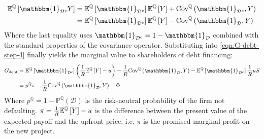 \documentclass[../main.tex]{subfiles}
\begin{document}
            \begin{align*}
                \mathbb{E}^{\mathbb{Q}}\left[
                    \mathbbm{1}_{\mathcal{D}^{c}}Y
                \right]
                &=
                \mathbb{E}^{\mathbb{Q}}\left[\mathbbm{1}_{\mathcal{D}^{c}}\right] 
                \mathbb{E}^{\mathbb{Q}}\left[Y\right] 
                + 
                \text{Cov}^{\mathbb{Q}}\left(\mathbbm{1}_{\mathcal{D}^{c}}, Y\right) 
                \\
                &=
                \mathbb{E}^{\mathbb{Q}}\left[\mathbbm{1}_{\mathcal{D}^{c}}\right] 
                \mathbb{E}^{\mathbb{Q}}\left[Y\right] 
                - 
                \text{Cov}^{\mathbb{Q}}\left(\mathbbm{1}_{\mathcal{D}}, Y\right) 
            \end{align*}
        Where the last equality uses $\mathbbm{1}_{\mathcal{D}^{c}} = 1 - \mathbbm{1}_{\mathcal{D}}$ 
        combined with the standard properties of the covariance operator.
        Substituting into \cref{eqn:G-debt-step-4} finally yields the marginal value to shareholders of debt financing:
            \begin{align}
                G_{\text{debt}} &=
                \mathbb{E}^{\mathbb{Q}}\left[\mathbbm{1}_{\mathcal{D}^{c}}\right] 
                \left(
                    \discountfactor
                    \mathbb{E}^{\mathbb{Q}}\left[Y\right] 
                    - u
                \right)
                -
                \discountfactor
                \text{Cov}^{\mathbb{Q}}\left(\mathbbm{1}_{\mathcal{D}}, Y\right) 
                - 
                \mathbb{E}^{\mathbb{Q}}\left[
                    \mathbbm{1}_{\mathcal{D}^{c}}
                \right] \discountfactor u S
                \nonumber \\
                &= 
                p^{\mathbb{Q}} \pi 
                - \discountfactor 
                \text{Cov}^{\mathbb{Q}}\left(
                    \mathbbm{1}_{\mathcal{D}}, 
                    Y
                \right) 
                - \Phi
                \label{eqn:marginal-shareholder-value-debt-financing}
            \end{align}
        Where $p^{\mathbb{Q}} = 1 - \mathbb{P}^{\mathbb{Q}}\left(\mathcal{D}\right)$ 
        is the risk-neutral probability of the firm not defaulting. 
        $\pi = \frac{1}{R} \mathbb{E}^{\mathbb{Q}}\left[Y\right] - u$ 
        is the difference between the present value of the expected payoff and the upfront price, 
        i.e. $\pi$ is the promised marginal profit on the new project. 
\end{document}
